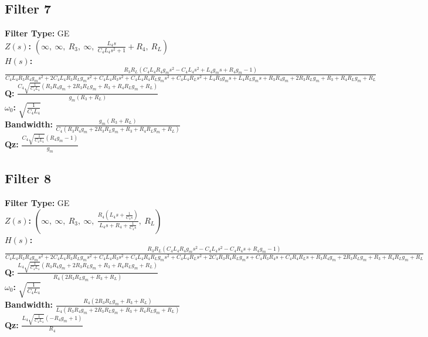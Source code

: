 \documentclass{article}
\begin{document}
\subsection*{Filter 7}
\textbf{Filter Type:} GE \\ 
\textbf{$Z(s)$:} $\left( \infty, \  \infty, \  R_{3}, \  \infty, \  \frac{L_{4} s}{C_{4} L_{4} s^{2} + 1} + R_{4}, \  R_{L}\right)$ \\ 
\textbf{$H(s)$:} $\frac{R_{3} R_{L} \left(C_{4} L_{4} R_{4} g_{m} s^{2} - C_{4} L_{4} s^{2} + L_{4} g_{m} s + R_{4} g_{m} - 1\right)}{C_{4} L_{4} R_{3} R_{4} g_{m} s^{2} + 2 C_{4} L_{4} R_{3} R_{L} g_{m} s^{2} + C_{4} L_{4} R_{3} s^{2} + C_{4} L_{4} R_{4} R_{L} g_{m} s^{2} + C_{4} L_{4} R_{L} s^{2} + L_{4} R_{3} g_{m} s + L_{4} R_{L} g_{m} s + R_{3} R_{4} g_{m} + 2 R_{3} R_{L} g_{m} + R_{3} + R_{4} R_{L} g_{m} + R_{L}}$ \\ 
\textbf{Q:} $\frac{C_{4} \sqrt{\frac{1}{C_{4} L_{4}}} \left(R_{3} R_{4} g_{m} + 2 R_{3} R_{L} g_{m} + R_{3} + R_{4} R_{L} g_{m} + R_{L}\right)}{g_{m} \left(R_{3} + R_{L}\right)}$ \\ 
\textbf{$\omega_0$:} $\sqrt{\frac{1}{C_{4} L_{4}}}$ \\ 
\textbf{Bandwidth:} $\frac{g_{m} \left(R_{3} + R_{L}\right)}{C_{4} \left(R_{3} R_{4} g_{m} + 2 R_{3} R_{L} g_{m} + R_{3} + R_{4} R_{L} g_{m} + R_{L}\right)}$ \\ 
\textbf{Qz:} $\frac{C_{4} \sqrt{\frac{1}{C_{4} L_{4}}} \left(R_{4} g_{m} - 1\right)}{g_{m}}$ \\ 
\subsection*{Filter 8}
\textbf{Filter Type:} GE \\ 
\textbf{$Z(s)$:} $\left( \infty, \  \infty, \  R_{3}, \  \infty, \  \frac{R_{4} \left(L_{4} s + \frac{1}{C_{4} s}\right)}{L_{4} s + R_{4} + \frac{1}{C_{4} s}}, \  R_{L}\right)$ \\ 
\textbf{$H(s)$:} $\frac{R_{3} R_{L} \left(C_{4} L_{4} R_{4} g_{m} s^{2} - C_{4} L_{4} s^{2} - C_{4} R_{4} s + R_{4} g_{m} - 1\right)}{C_{4} L_{4} R_{3} R_{4} g_{m} s^{2} + 2 C_{4} L_{4} R_{3} R_{L} g_{m} s^{2} + C_{4} L_{4} R_{3} s^{2} + C_{4} L_{4} R_{4} R_{L} g_{m} s^{2} + C_{4} L_{4} R_{L} s^{2} + 2 C_{4} R_{3} R_{4} R_{L} g_{m} s + C_{4} R_{3} R_{4} s + C_{4} R_{4} R_{L} s + R_{3} R_{4} g_{m} + 2 R_{3} R_{L} g_{m} + R_{3} + R_{4} R_{L} g_{m} + R_{L}}$ \\ 
\textbf{Q:} $\frac{L_{4} \sqrt{\frac{1}{C_{4} L_{4}}} \left(R_{3} R_{4} g_{m} + 2 R_{3} R_{L} g_{m} + R_{3} + R_{4} R_{L} g_{m} + R_{L}\right)}{R_{4} \left(2 R_{3} R_{L} g_{m} + R_{3} + R_{L}\right)}$ \\ 
\textbf{$\omega_0$:} $\sqrt{\frac{1}{C_{4} L_{4}}}$ \\ 
\textbf{Bandwidth:} $\frac{R_{4} \left(2 R_{3} R_{L} g_{m} + R_{3} + R_{L}\right)}{L_{4} \left(R_{3} R_{4} g_{m} + 2 R_{3} R_{L} g_{m} + R_{3} + R_{4} R_{L} g_{m} + R_{L}\right)}$ \\ 
\textbf{Qz:} $\frac{L_{4} \sqrt{\frac{1}{C_{4} L_{4}}} \left(- R_{4} g_{m} + 1\right)}{R_{4}}$ \\ 
\end{document}
